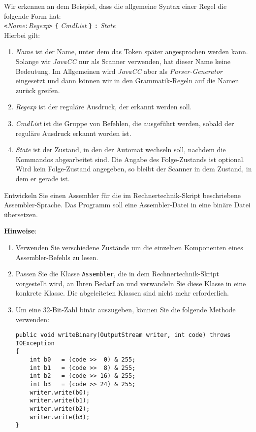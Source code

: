 Wir erkennen an dem Beispiel, dass die allgemeine Syntax einer Regel die folgende 
Form hat:
\\[0.2cm]
\hspace*{1.3cm}
\texttt{<}\textsl{Name}\texttt{:}\textsl{Regexp}\texttt{>} 
\texttt{\{} \textsl{CmdList} \texttt{\}} \texttt{:} \textsl{State}
\\[0.2cm]
Hierbei gilt:
\begin{enumerate}
\item \textsl{Name} ist der Name, unter dem das Token sp\"ater angesprochen werden kann.
      Solange wir \textsl{JavaCC}\/ nur als Scanner verwenden, hat dieser Name keine
      Bedeutung.  Im Allgemeinen wird \textsl{JavaCC}\/ aber als \emph{Parser-Generator}
      eingesetzt und dann k\"onnen wir in den Grammatik-Regeln auf die Namen zur\"uck greifen.
\item \textsl{Regexp} ist der regul\"are Ausdruck, der erkannt werden soll.
\item \textsl{CmdList} ist die Gruppe von Befehlen, die ausgef\"uhrt werden, sobald der regul\"are
      Ausdruck erkannt worden ist.
\item \textsl{State} ist der Zustand, in den der Automat wechseln soll, nachdem die
      Kommandos abgearbeitet sind.  Die Angabe des Folge-Zustands ist optional.
      Wird kein Folge-Zustand angegeben, so bleibt der Scanner in dem Zustand, in dem er
      gerade ist.
\end{enumerate}
\pagebreak

\exercise
Entwickeln Sie einen Assembler f\"ur die im Rechnertechnik-Skript
beschriebene Assembler-Sprache.  Das Programm soll eine Assembler-Datei in eine bin\"are
Datei \"ubersetzen.
\vspace*{0.3cm}

\noindent
\textbf{Hinweise}:  
\begin{enumerate}
\item Verwenden Sie verschiedene Zust\"ande um die einzelnen Komponenten eines Assembler-Befehls
      zu lesen.
\item Passen Sie die Klasse \texttt{Assembler}, die in dem
      Rechnertechnik-Skript vorgestellt wird, an Ihren Bedarf an und verwandeln Sie diese Klasse
      in eine konkrete Klasse.  Die abgeleiteten Klassen sind nicht mehr erforderlich.
\item Um eine 32-Bit-Zahl bin\"ar auszugeben, k\"onnen Sie die folgende Methode verwenden:
      \begin{verbatim}
public void writeBinary(OutputStream writer, int code) throws IOException
{
    int b0   = (code >>  0) & 255;
    int b1   = (code >>  8) & 255;
    int b2   = (code >> 16) & 255;
    int b3   = (code >> 24) & 255;
    writer.write(b0);
    writer.write(b1);
    writer.write(b2);
    writer.write(b3);
}
\end{verbatim}

\end{enumerate}

